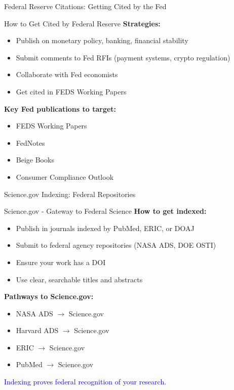 \documentclass[11pt]{beamer}
\begin{document}
	\begin{frame}{Federal Reserve Citations: Getting Cited by the Fed}
		\small
		\begin{block}{How to Get Cited by Federal Reserve}
			\textbf{Strategies:}
			\begin{itemize}
				\item Publish on monetary policy, banking, financial stability
				\item Submit comments to Fed RFIs (payment systems, crypto regulation)
				\item Collaborate with Fed economists
				\item Get cited in FEDS Working Papers
			\end{itemize}
			\textbf{Key Fed publications to target:}
			\begin{itemize}
				\item FEDS Working Papers
				\item FedNotes
				\item Beige Books
				\item Consumer Compliance Outlook
			\end{itemize}
		\end{block}
	\end{frame}
	
	\begin{frame}{Science.gov Indexing: Federal Repositories}
		\small
		\begin{block}{Science.gov - Gateway to Federal Science}
			\textbf{How to get indexed:}
			\begin{itemize}
				\item Publish in journals indexed by PubMed, ERIC, or DOAJ
				\item Submit to federal agency repositories (NASA ADS, DOE OSTI)
				\item Ensure your work has a DOI
				\item Use clear, searchable titles and abstracts
			\end{itemize}
			\textbf{Pathways to Science.gov:}
			\begin{itemize}
				\item NASA ADS $\rightarrow$ Science.gov
				\item Harvard ADS $\rightarrow$ Science.gov
				\item ERIC $\rightarrow$ Science.gov
				\item PubMed $\rightarrow$ Science.gov
			\end{itemize}
			\textcolor{blue}{Indexing proves federal recognition of your research.}
		\end{block}
	\end{frame}
	
\end{document}
